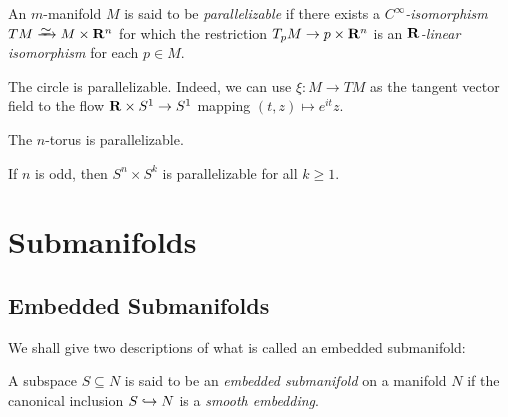 \begin{definition}
\label{def:parallelizable-manifold}
An \(m\)-manifold \(M\) is said to be \emph{parallelizable} if there exists a
\emph{\(C^{\infty}\)-isomorphism} \(T M \isoto M \times \R^n\) for which the
restriction \(T_p M \to p \times \mathbf{R}^n\) is an \emph{\(\mathbf{R}\)-linear isomorphism}
for each \(p \in M\).
\end{definition}

\begin{example}
\label{exp:S1-parallelizable}
The circle is parallelizable. Indeed, we can use \(\xi: M \to T M\) as the
tangent vector field to the flow \(\mathbf{R} \times S^1 \to S^1\) mapping
\((t, z) \mapsto e^{i t} z\).
\end{example}

\begin{proposition}
\label{prop:n-torus-parallelizable}
The \(n\)-torus is parallelizable.
\end{proposition}

\begin{proposition}
\label{prop:Sn-times-Sk-parallelizable}
If \(n\) is odd, then \(S^n \times S^k\) is parallelizable for all \(k \geq 1\).
\end{proposition}


\section{Submanifolds}

\subsection{Embedded Submanifolds}

We shall give two descriptions of what is called an embedded submanifold:

\begin{definition}
\label{def:embedded-submanifold}
A subspace \(S \subseteq N\) is said to be an \emph{embedded submanifold} on a
manifold \(N\) if the canonical inclusion \(S \hookrightarrow N\) is a \emph{smooth
  embedding}.
\end{definition}

